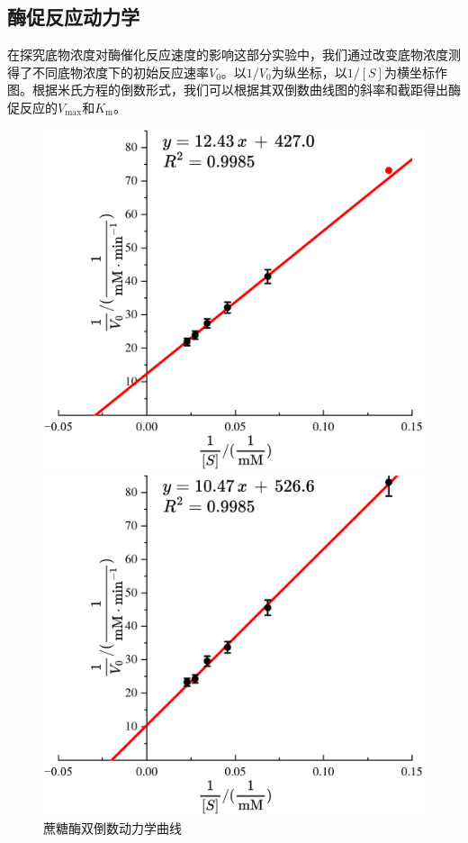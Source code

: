 \subsection{酶促反应动力学}
在探究底物浓度对酶催化反应速度的影响这部分实验中，我们通过改变底物浓度测得了不同底物浓度下的初始反应速率$V_0$。以$1/{V_0}$为纵坐标，以$1/{[S]}$为横坐标作图。根据米氏方程的倒数形式，我们可以根据其双倒数曲线图的斜率和截距得出酶促反应的$V_\mathrm{max}$和$K_\mathrm{m}$。

\begin{figure}[H]
    \begin{minipage}[t]{0.49\textwidth}
        \includegraphics[width = \textwidth]{figure/1215/Kinetics-Sucrose.pdf}
        \caption{蔗糖酶双倒数动力学曲线}
        \label{fig:Kinetics-Sucrose}
    \end{minipage}
    \begin{minipage}[t]{0.49\textwidth}
        \includegraphics[width = \textwidth]{figure/1215/Kinetics-EnzymeCut.pdf}

\end{minipage}
\end{figure}
